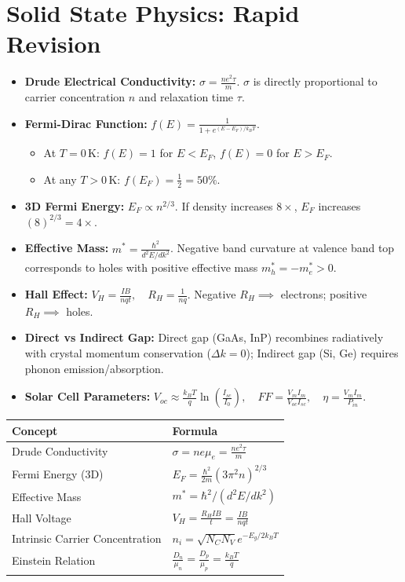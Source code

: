 \chapter{Solid State Physics: Rapid Revision}

\begin{highyieldbox}
\begin{itemize}[leftmargin=*]
    \item \textbf{Drude Electrical Conductivity:} $\sigma = \frac{n e^2 \tau}{m}$. $\sigma$ is directly proportional to carrier concentration $n$ and relaxation time $\tau$.
    \item \textbf{Fermi-Dirac Function:} $f(E) = \frac{1}{1 + e^{(E-E_F)/k_B T}}$.
    \begin{itemize}
        \item At $T = 0\,\text{K}$: $f(E) = 1$ for $E < E_F$, $f(E) = 0$ for $E > E_F$.
        \item At any $T > 0\,\text{K}$: $f(E_F) = \frac{1}{2} = 50\%$.
    \end{itemize}
    \item \textbf{3D Fermi Energy:} $E_F \propto n^{2/3}$. If density increases $8\times$, $E_F$ increases $(8)^{2/3} = 4\times$.
    \item \textbf{Effective Mass:} $m^* = \frac{\hbar^2}{d^2E/dk^2}$. Negative band curvature at valence band top corresponds to holes with positive effective mass $m_h^* = -m_e^* > 0$.
    \item \textbf{Hall Effect:} $V_H = \frac{I B}{n q t}, \quad R_H = \frac{1}{n q}$. Negative $R_H \implies$ electrons; positive $R_H \implies$ holes.
    \item \textbf{Direct vs Indirect Gap:} Direct gap (GaAs, InP) recombines radiatively with crystal momentum conservation ($\Delta k = 0$); Indirect gap (Si, Ge) requires phonon emission/absorption.
    \item \textbf{Solar Cell Parameters:} $V_{oc} \approx \frac{k_B T}{q}\ln\left(\frac{I_{sc}}{I_0}\right), \quad FF = \frac{V_m I_m}{V_{oc} I_{sc}}, \quad \eta = \frac{V_m I_m}{P_{in}}$.
\end{itemize}
\end{highyieldbox}

\begin{fastcheck}
\begin{tabularx}{\textwidth}{l X}
\toprule
\textbf{Concept} & \textbf{Formula} \\
\midrule
Drude Conductivity & $\sigma = n e \mu_e = \frac{n e^2 \tau}{m}$ \\
Fermi Energy (3D) & $E_F = \frac{\hbar^2}{2m}(3\pi^2 n)^{2/3}$ \\
Effective Mass & $m^* = \hbar^2 / (d^2E/dk^2)$ \\
Hall Voltage & $V_H = \frac{R_H I B}{t} = \frac{I B}{n q t}$ \\
Intrinsic Carrier Concentration & $n_i = \sqrt{N_C N_V} e^{-E_g/2k_BT}$ \\
Einstein Relation & $\frac{D_n}{\mu_n} = \frac{D_p}{\mu_p} = \frac{k_B T}{q}$ \\
\bottomrule
\end{tabularx}
\end{fastcheck}
